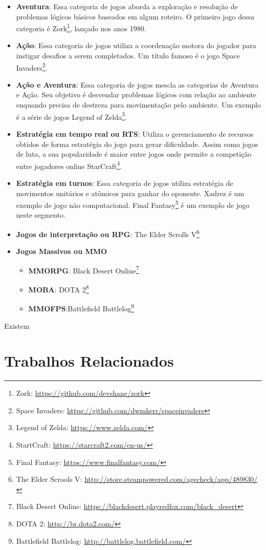 \begin{itemize}
  \item \textbf{Aventura}: Essa categoria de jogos aborda a exploração e resolução de problemas lógicos básicos baseados em algum roteiro. O primeiro jogo dessa categoria é Zork\footnote{Zork: \url{https://github.com/devshane/zork}}, lançado nos anos 1980.
  \item \textbf{Ação}: Essa categoria de jogos utiliza a coordenação motora do jogador para instigar desafios a serem completados. Um título famoso é o jogo Space Invaders\footnote{Space Invaders: \url{https://github.com/dwmkerr/spaceinvaders}}.
  \item \textbf{Ação e Aventura}: Essa categoria de jogos mescla as categorias de Aventura e Ação. Seu objetivo é desvendar problemas lógicos com relação ao ambiente enquando precisa de destreza para movimentação pelo ambiente. Um exemplo é a série de jogos Legend of Zelda\footnote{Legend of Zelda: \url{https://www.zelda.com/}}.
  \item \textbf{Estratégia em tempo real ou \ac{RTS}}: Utiliza o gerenciamento de recursos obtidos de forma estratégia do jogo para gerar dificuldade. Assim como jogos de luta, a sua popularidade é maior entre jogos onde permite a competição entre jogadores online StarCraft\footnote{StartCraft: \url{https://starcraft2.com/en-us/}}.
  \item \textbf{Estratégia em turnos}: Essa categoria de jogos utiliza estratégia de movimentos unitários e atômicos para ganhar do oponente. Xadrez é um exemplo de jogo não computacional. Final Fantasy\footnote{Final Fantasy: \url{https://www.finalfantasy.com/}} é um exemplo de jogo neste segmento.
  \item \textbf{Jogos de interpretação ou \ac{RPG}}: The Elder Scrolls V\footnote{The Elder Scrools V: \url{http://store.steampowered.com/agecheck/app/489830/}}
  \item \textbf{Jogos Massivos ou \ac{MMO}}
    \begin{itemize}
      \item \textbf{\ac{MMORPG}}: Black Desert Online\footnote{Black Desert Online: \url{https://blackdesert.playredfox.com/black_desert}}
      \item \textbf{\ac{MOBA}}: DOTA 2\footnote{DOTA 2: \url{http://br.dota2.com/}}
      \item \textbf{\ac{MMOFPS}}:Battlefield Battlelog\footnote{Battlefield Battlelog: \url{http://battlelog.battlefield.com/}}
    \end{itemize}
\end{itemize}



Existem


\section{Trabalhos Relacionados}
\label{sec:similares}
